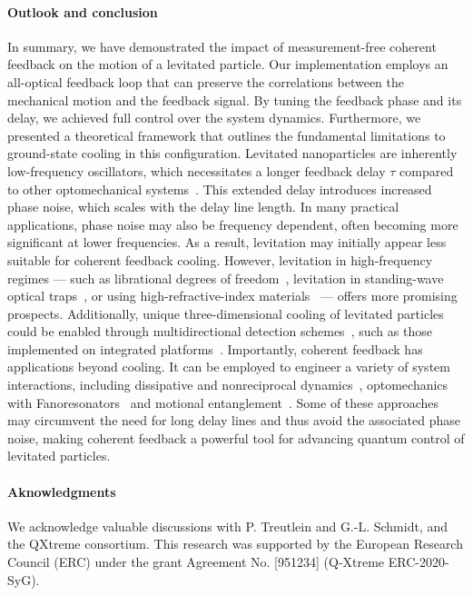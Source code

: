 \documentclass[reprint,aps,prl,superscriptaddress]{revtex4-2}
\begin{document}
\paragraph{Outlook and conclusion}
In summary, we have demonstrated the impact of measurement-free coherent feedback on the motion of a levitated particle. Our implementation employs an all-optical feedback loop that can preserve the correlations between the mechanical motion and the feedback signal. By tuning the feedback phase and its delay, we achieved full control over the system dynamics. Furthermore, we presented a theoretical framework that outlines the fundamental limitations to ground-state cooling in this configuration.
Levitated nanoparticles are inherently low-frequency oscillators, which necessitates a longer feedback delay $\tau$ compared to other optomechanical systems~\cite{Ernzer2023-coherent-cooling-membrane}. This extended delay introduces increased phase noise, which scales with the delay line length. In many practical applications, phase noise may also be frequency dependent, often becoming more significant at lower frequencies. As a result, levitation may initially appear less suitable for coherent feedback cooling. However, levitation in high-frequency regimes — such as librational degrees of freedom~\cite{dania2024high,pontin2023simultaneous,gao2024feedback,bang2020five}, levitation in standing-wave optical traps~\cite{kamba2021recoil}, or using high-refractive-index materials~\cite{lepeshov2023levitated,afridi2025controlling,lee2025inverse} — offers more promising prospects.
Additionally, unique three-dimensional cooling of levitated particles could be enabled through multidirectional detection schemes~\cite{Dinter2024-3d-displacement-sensing-mode-decomposition}, such as those implemented on integrated platforms~\cite{Melo2024-levitation-on-chip}.
Importantly, coherent feedback has applications beyond cooling. It can be employed to engineer a variety of system interactions, including dissipative and nonreciprocal dynamics~\cite{Karg2019-remote-hamiltonian-mediated-light,metelmann2015nonreciprocal}, optomechanics with Fanoresonators~\cite{du2025coherent} and motional entanglement~\cite{Lloyd2000-coherent-quantum-feedback,li2017enhanced,Zambon2025-remote-entanglement-particles}. Some of these approaches may circumvent the need for long delay lines and thus avoid the associated phase noise, making coherent feedback a powerful tool for advancing quantum control of levitated particles.

\paragraph{Aknowledgments}
We acknowledge valuable discussions with P. Treutlein and G.-L. Schmidt, and the QXtreme consortium. This research was supported by the European Research Council (ERC) under the grant Agreement No. [951234] (Q-Xtreme ERC-2020-SyG).





\end{document}
